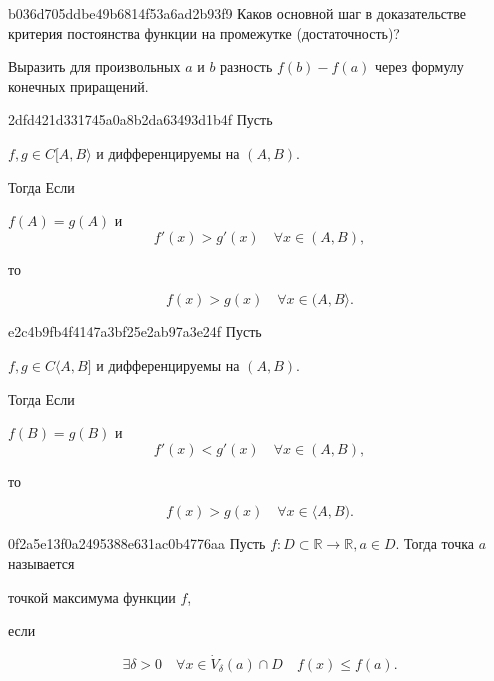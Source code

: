 \begin{note}{b036d705ddbe49b6814f53a6ad2b93f9}
    Каков основной шаг в доказательстве критерия постоянства функции на промежутке (достаточность)?

    \begin{cloze}{1}
        Выразить для произвольных \( a \) и \( b \) разность \( f(b) - f(a) \) через формулу конечных приращений.
    \end{cloze}
\end{note}

\begin{note}{2dfd421d331745a0a8b2da63493d1b4f}
    Пусть \begin{icloze}{3}\( f, g \in C[A, B\rangle \) и дифференцируемы на \( (A,  B) \).\end{icloze} Тогда
    Если \begin{icloze}{2}\( f(A) = g(A) \) и
        \[
            f'(x) > g'(x) \quad \forall x \in (A, B),
        \]
    \end{icloze}    то
    \begin{icloze}{1}\[
        f(x) > g(x) \quad \forall x \in (A, B\rangle.
    \]\end{icloze}
\end{note}

\begin{note}{e2c4b9fb4f4147a3bf25e2ab97a3e24f}
    Пусть \begin{icloze}{3}\( f, g \in C \langle A, B] \) и дифференцируемы на \( (A,  B) \).\end{icloze} Тогда
    Если \begin{icloze}{2}\( f(B) = g(B) \) и
        \[
            f'(x) < g'(x) \quad \forall x \in (A, B),
        \]
    \end{icloze}    то
    \begin{icloze}{1}\[
        f(x) > g(x) \quad \forall x \in \langle A, B).
    \]\end{icloze}
\end{note}

\begin{note}{0f2a5e13f0a2495388e631ac0b4776aa}
    Пусть \( f : D \subset \mathbb R \to \mathbb R, a \in D \). Тогда точка \( a \) называется \begin{icloze}{2}точкой максимума функции \( f \),\end{icloze} если
    \begin{icloze}{1}\[
                         \exists \delta > 0 \quad \forall x \in \dot V_{\delta} (a) \cap D \quad f(x) \leqslant f(a).
                     \]\end{icloze}
\end{note}

